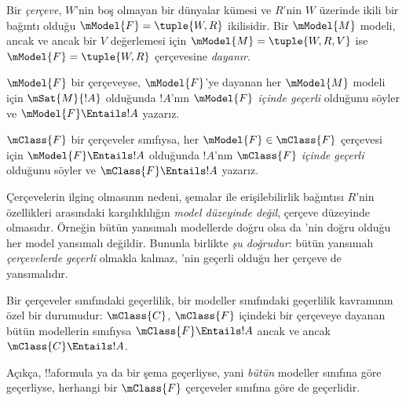



\begin{defn}
  Bir \emph{çerçeve}, $W$'nin boş olmayan bir dünyalar kümesi ve $R$'nin
  $W$ üzerinde ikili bir bağıntı olduğu $\mModel{F}=\tuple{W,R}$ ikilisidir.
  Bir $\mModel{M}$ modeli, ancak ve ancak bir $V$ değerlemesi için
  $\mModel{M}=\tuple{W,R,V}$ ise $\mModel{F}=\tuple{W,R}$ çerçevesine
  \emph{dayanır}.
\end{defn}

\begin{defn}
  $\mModel{F}$ bir çerçeveyse, $\mModel{F}$'ye dayanan her
  $\mModel{M}$ modeli için $\mSat{M}{!A}$ olduğunda $!A$'nın
  \emph{$\mModel{F}$ içinde geçerli} olduğunu söyler ve
  $\mModel{F}\Entails !A$ yazarız.

  $\mClass{F}$ bir çerçeveler sınıfıysa, her $\mModel{F}\in\mClass{F}$
  çerçevesi için $\mModel{F}\Entails !A$ olduğunda $!A$'nın
  \emph{$\mClass{F}$ içinde geçerli} olduğunu söyler ve
  $\mClass{F}\Entails !A$ yazarız.
\end{defn}

Çerçevelerin ilginç olmasının nedeni, şemalar ile erişilebilirlik
bağıntısı $R$'nin özellikleri arasındaki karşılıklılığın
\emph{model düzeyinde değil}, çerçeve düzeyinde olmasıdır. Örneğin  bütün yansımalı
modellerde doğru olsa da 'nin doğru olduğu her model yansımalı
değildir. Bununla birlikte \emph{şu doğrudur}:  bütün yansımalı
\emph{çerçevelerde} \emph{geçerli} olmakla kalmaz, 'nin geçerli olduğu
her çerçeve de yansımalıdır.

\begin{rem}
Bir çerçeveler sınıfındaki geçerlilik, bir modeller sınıfındaki geçerlilik
kavramının özel bir durumudur: $\mClass{C}$, $\mClass{F}$ içindeki bir
çerçeveye dayanan bütün modellerin sınıfıysa $\mClass{F}\Entails !A$ ancak
ve ancak $\mClass{C}\Entails !A$.

Açıkça, !!a{formula} ya da bir şema geçerliyse, yani \emph{bütün}
modeller sınıfına göre geçerliyse, herhangi bir $\mClass{F}$ çerçeveler
sınıfına göre de geçerlidir.
\end{rem}

